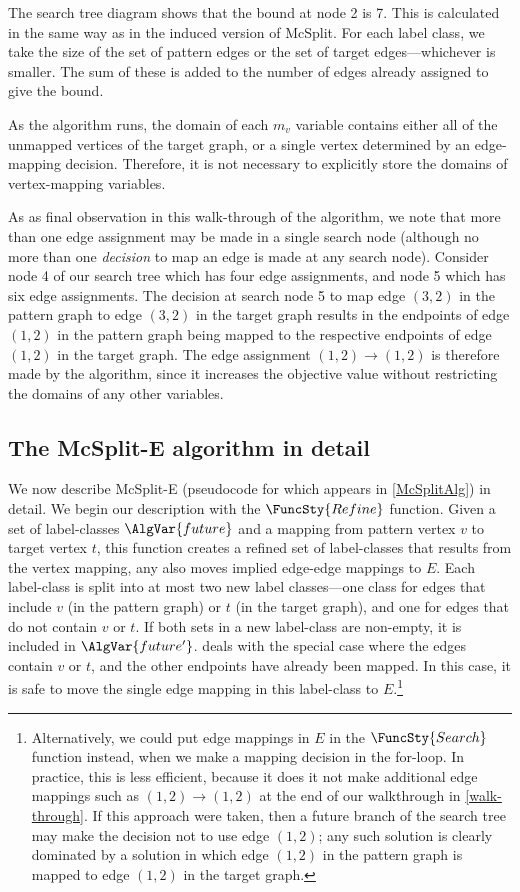 The search tree diagram shows that the bound at node 2 is 7.  This is calculated in the same way as
in the induced version of McSplit.  For each label class, we take the size of the 
set of pattern edges or the set of target edges---whichever is smaller.  The sum of these is added
to the number of edges already assigned to give the bound.

As the algorithm runs, the domain of each $m_v$ variable contains either all of the unmapped
vertices of the target graph, or
a single vertex determined by an edge-mapping decision.  Therefore, it is not necessary to explicitly
store the domains of vertex-mapping variables.

As as final observation in this walk-through of the algorithm, we note that more than one edge
assignment may be made in a single search node (although no more than one \emph{decision} to map
an edge is made at any search node).  Consider node 4 of our search tree which has
four edge assignments, and node 5 which has six edge assignments.  The decision at search node 5
to map edge $(3,2)$ in the pattern graph to edge $(3,2)$ in the target graph results in the endpoints
of edge $(1,2)$ in the pattern graph being mapped to the respective endpoints of edge $(1,2)$ in
the target graph.  The edge assignment $(1,2)\rightarrow(1,2)$ is therefore made by the algorithm,
since it increases the objective value without restricting the domains of any other variables.

\subsection{The McSplit-E algorithm in detail}

We now describe McSplit-E (pseudocode for which appears in \cref{McSplitAlg})
in detail.
We begin our description with the $\FuncSty{Refine}$ function.  Given a set of label-classes
$\AlgVar{future}$ and a mapping from pattern vertex $v$ to target vertex $t$, this function
creates a refined set of label-classes that results from the vertex mapping,
any also moves implied edge-edge mappings to $E$.  Each label-class is split into at most
two new label classes---one class for edges that include $v$ (in the pattern graph) or $t$
(in the target graph), and one for edges that do not contain $v$ or $t$.  If both sets in a new
label-class are non-empty, it is included in $\AlgVar{future'}$.   deals with the
special case where the edges contain $v$ or $t$, and the other endpoints have already been mapped.
In this case, it is safe to move the single edge mapping in this label-class to $E$.\footnote{Alternatively,
we could put edge mappings in $E$ in the $\FuncSty{Search}$ function instead, when we make a mapping decision
in the for-loop.  In practice, this is less efficient, because it does it not make additional
edge mappings such as $(1,2)\rightarrow(1,2)$ at the end of our walkthrough in \cref{walk-through}.
If this approach were taken, then a future branch of the search tree may make the decision not
to use edge $(1,2)$; any such solution is clearly dominated by a solution in which edge $(1,2)$
in the pattern graph is mapped to edge $(1,2)$ in the target graph.}

